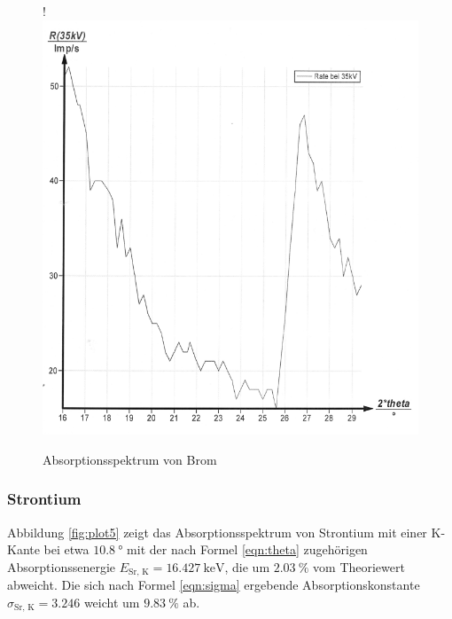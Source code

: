 \begin{figure}[H]!
  \centering
  \includegraphics[scale=0.3]{content/bild6.png}
  \caption{Absorptionsspektrum von Brom}
  \label{fig:plot4}
\end{figure}

\subsubsection{Strontium}

Abbildung \ref{fig:plot5} zeigt das Absorptionsspektrum von Strontium mit einer 
K-Kante bei etwa $\SI{10.8}{\degree}$ mit der nach Formel \eqref{eqn:theta}
zugehörigen Absorptionssenergie $ E_\text{Sr, K} = \SI{16.427}{\kilo\eV}$,
die um $\SI{2.03}{\percent}$ vom Theoriewert abweicht. Die sich nach Formel 
\eqref{eqn:sigma} ergebende Absorptionskonstante $\sigma_\text{Sr, K} = 3.246$
weicht um $\SI{9.83}{\percent}$ ab.

